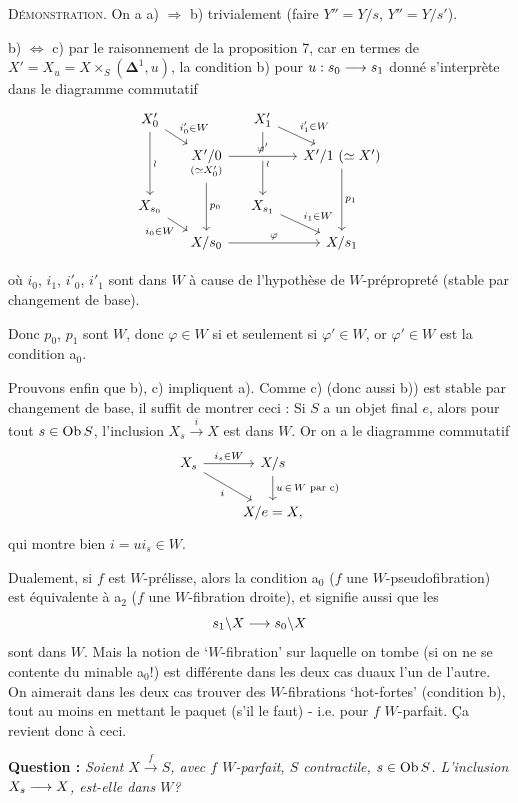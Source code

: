 \textsc{Démonstration}. On a a) $\Longrightarrow$ b) trivialement (faire $Y''=Y/s$, $Y''=Y/s'$).

b) $\Longleftrightarrow$ c) par le raisonnement de la proposition 7, car en termes de $X'=X_u=X\times_S(\boldsymbol{\Delta}^1,u)$, la condition b) pour $u : s_0\longrightarrow s_1$ donné s'interprète dans le diagramme commutatif
\[
\begin{tikzcd}[column sep=small, row sep=small]
X'_0 \arrow[dr, "i'_0\in W"] \arrow[dd, "\wr"] & & X'_1 \arrow[dr, "i'_1\in W"] \arrow[dd, "\wr"] & \\
 & \underset{(\simeq X'_0)}{X'/0} \arrow[rr, "\varphi'", crossing over] \arrow[dd, "p_0"] & & X'/1\ (\simeq X') \arrow[dd, "p_1"] \\
X_{s_0} \arrow[dr, "i_0\in W"'] & & X_{s_1} \arrow[dr, "i_1\in W"] & \\
 & X/s_0 \arrow[rr, "\varphi"] & & X/s_1
\end{tikzcd}
\]

 où $i_0$, $i_1$, $i'_0$, $i'_1$ sont dans $W$ à cause de l'hypothèse de $W$-prépropreté (stable par changement de base).

Donc $p_0$, $p_1$ sont $W$, donc $\varphi\in W$ si et seulement si $\varphi'\in W$, or $\varphi'\in W$ est la condition a$_0$.

Prouvons enfin que b), c) impliquent a). Comme c) (donc aussi b)) est stable par changement de base, il suffit de montrer ceci : Si $S$ a un objet final $e$, alors pour tout $s\in\operatorname{Ob} S$, l'inclusion $X_s\xrightarrow{\ i\ }X$ est dans $W$. Or on a le diagramme commutatif
\[
\begin{tikzcd}
X_s \arrow[r, "i_s\in W"] \arrow[dr, "i"'] & X/s \arrow[d, "u\,\in\,W\text{ par c) }"] \\
 & X/e=X,
\end{tikzcd}
\]
qui montre bien $i=ui_s\in W$.

Dualement, si $f$ est $W$-prélisse, alors la condition a$_0$ ($f$ une $W$-pseudofibration) est équivalente à a$_2$ ($f$ une $W$-fibration droite), et signifie aussi que les
\[ s_1\backslash X\longrightarrow s_0\backslash X \]
sont dans $W$. Mais la notion de ‘$W$-fibration’ sur laquelle on tombe (si on ne se contente du minable a$_0$!) est différente dans les deux cas duaux l'un de l'autre. On aimerait dans les deux cas trouver des $W$-fibrations ‘hot-fortes’ (condition b), tout au moins en mettant le paquet (s'il le faut) - i.e. pour $f$ $W$-parfait. Ça revient donc à ceci.

\textbf{Question :} \textit{Soient $X\xrightarrow{\ f\ }S$, avec $f$ $W$-parfait, $S$ contractile, $s\in\operatorname{Ob} S$. L'inclusion $X_s\longrightarrow X$, est-elle dans $W$?}

